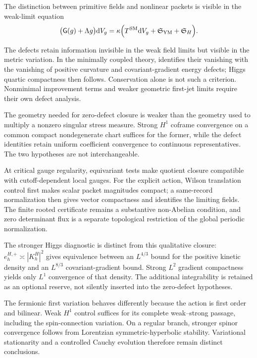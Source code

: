 \documentclass[11pt]{article}
\numberwithin{equation}{section}
\theoremstyle{definition}
\theoremstyle{remark}
\newcommand{\dd}{\mathrm d}
\newcommand{\Eins}{\mathsf G}
\newcommand{\dV}{\dd V}
\begin{document}
The distinction between primitive fields and nonlinear packets is visible
in the weak-limit equation
\begin{equation}
\bigl(\Eins(g)+\Lambda g\bigr)\dV_g
=
\kappa\Bigl(
T^{\mathrm{SM}}\dV_g
+\mathfrak S_{\mathrm{YM}}
+\mathfrak S_H
\Bigr).
\label{eq:discussion-defect}
\end{equation}

The defects retain information invisible in the weak field limits but
visible in the metric variation. In the minimally coupled theory,
 identifies their vanishing with the
vanishing of positive curvature and covariant-gradient energy defects;
Higgs quartic compactness then follows. Conservation alone is not such a
criterion. Nonminimal improvement terms and weaker geometric first-jet
limits require their own defect analysis.

The geometry needed for zero-defect closure is weaker than the geometry
used to multiply a nonzero singular stress measure. Strong $H^1$ coframe
convergence on a common compact nondegenerate chart suffices for the former,
while the defect identities retain uniform coefficient convergence to
continuous representatives. The two hypotheses are not interchangeable.

At critical gauge regularity, equivariant tests make quotient closure
compatible with cutoff-dependent local gauges. For the explicit action,
Wilson translation control first makes scalar packet magnitudes compact;
a same-record normalization then gives vector compactness and identifies
the limiting fields. The finite rooted certificate remains a substantive
non-Abelian condition, and zero determinant flux is a separate topological
restriction of the global periodic normalization.

The stronger Higgs diagnostic is distinct from this qualitative closure:
$e_h^{H,+}\asymp|K_h^H|^2$ gives equivalence between an $L^{4/3}$ bound
for the positive kinetic density and an $L^{8/3}$ covariant-gradient bound.
Strong $L^2$ gradient compactness yields only $L^1$ convergence of that
density. The additional integrability is retained as an optional reserve,
not silently inserted into the zero-defect hypotheses.

The fermionic first variation behaves differently because the action is
first order and bilinear. Weak $H^1$ control suffices for its complete
weak--strong passage, including the spin-connection variation. On a regular
branch, stronger spinor convergence follows from Lorentzian
symmetric-hyperbolic stability. Variational stationarity and a controlled
Cauchy evolution therefore remain distinct conclusions.
\end{document}

